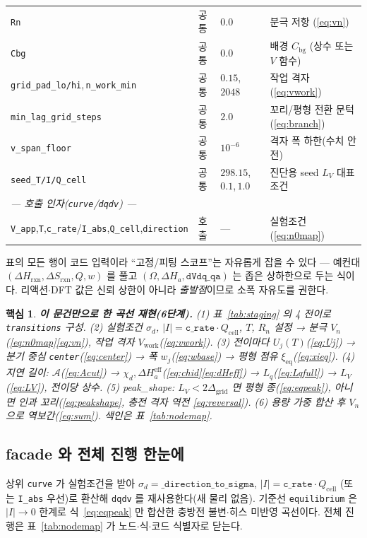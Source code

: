 \documentclass[11pt,a4paper]{article}
\newtheorem*{keybox}{핵심}
\newcommand{\eff}{\mathrm{eff}}
\newcommand{\eq}{\mathrm{eq}}
\newcommand{\cell}{\mathrm{cell}}
\newcommand{\bg}{\mathrm{bg}}
\newcommand{\rxn}{\mathrm{rxn}}
\newcommand{\work}{\mathrm{work}}
\newcommand{\code}[1]{\texttt{#1}}
\begin{document}
\begin{table}[t]
\begin{tabular}{l l l l}
\code{Rn} & 공통 & $0.0$ & 분극 저항 (\eqref{eq:vn}) \\
\code{Cbg} & 공통 & $0.0$ & 배경 $C_\bg$ (상수 또는 $V$ 함수) \\
\code{grid\_pad\_lo/hi},\,\code{n\_work\_min} & 공통 & $0.15$,\,$2048$ & 작업 격자 (\eqref{eq:vwork}) \\
\code{min\_lag\_grid\_steps} & 공통 & $2.0$ & 꼬리/평형 전환 문턱 (\eqref{eq:branch}) \\
\code{v\_span\_floor} & 공통 & $10^{-6}$ & 격자 폭 하한(수치 안전) \\
\code{seed\_T/I/Q\_cell} & 공통 & $298.15$,\,$0.1$,\,$1.0$ & 진단용 seed $L_V$ 대표 조건 \\
\multicolumn{4}{l}{\emph{— 호출 인자(\code{curve}/\code{dqdv}) —}}\\
\code{V\_app},\code{T},\code{c\_rate}/\code{I\_abs},\code{Q\_cell},\code{direction} & 호출 & --- & 실험조건 (\eqref{eq:n0map}) \\
\bottomrule
\end{tabular}
\end{table}

표의 모든 행이 코드 입력이라 ``고정/피팅 스코프''는 자유롭게 잡을 수 있다 — 예컨대 $(\Delta H_\rxn,\Delta S_\rxn,Q,w)$ 를
풀고 $(\Omega,\Delta H_a,\code{dVdq\_qa})$ 는 좁은 상하한으로 두는 식이다. 리액션$\cdot$DFT 값은 신뢰 상한이 아니라
\emph{출발점}이므로 소폭 자유도를 권한다.

\begin{keybox}
\textbf{이 문건만으로 한 곡선 재현(6단계).}
(1) 표~\ref{tab:staging} 의 4 전이로 \code{transitions} 구성.
(2) 실험조건 $\sigma_d$, $|I|=\code{c\_rate}\cdot Q_\cell$, $T$, $R_n$ 설정 → 분극 $V_n$(\eqref{eq:n0map}\eqref{eq:vn}), 작업 격자 $V_\work$(\eqref{eq:vwork}).
(3) 전이마다 $U_j(T)$(\eqref{eq:Uj}) → 분기 중심 \code{center}(\eqref{eq:center}) → 폭 $w_j$(\eqref{eq:wbase}) → 평형 점유 $\xi_\eq$(\eqref{eq:xieq}).
(4) 지연 길이: $\mathcal A$(\eqref{eq:Acut}) → $\chi_d,\Delta H_a^\eff$(\eqref{eq:chid}\eqref{eq:dHeff}) → $L_q$(\eqref{eq:Lqfull}) → $L_V$(\eqref{eq:LV}), 전이당 상수.
(5) peak\_shape: $L_V<2\Delta_\mathrm{grid}$ 면 평형 종(\eqref{eq:eqpeak}), 아니면 인과 꼬리(\eqref{eq:peakshape}, 충전 격자 역전 \eqref{eq:reversal}).
(6) 용량 가중 합산 후 $V_n$ 으로 역보간(\eqref{eq:sum}). 색인은 표~\ref{tab:nodemap}.
\end{keybox}

\subsection{facade 와 전체 진행 한눈에}
상위 \code{curve} 가 실험조건을 받아 $\sigma_d=\code{\_direction\_to\_sigma}$, $|I|=\code{c\_rate}\cdot Q_\cell$
(또는 \code{I\_abs} 우선)로 환산해 \code{dqdv} 를 재사용한다(새 물리 없음). 기준선 \code{equilibrium} 은
$|I|\to0$ 한계로 식~\eqref{eq:eqpeak} 만 합산한 충방전 불변$\cdot$히스 미반영 곡선이다. 전체 진행은 표~\ref{tab:nodemap}
가 노드$\cdot$식$\cdot$코드 식별자로 닫는다.
\end{document}
